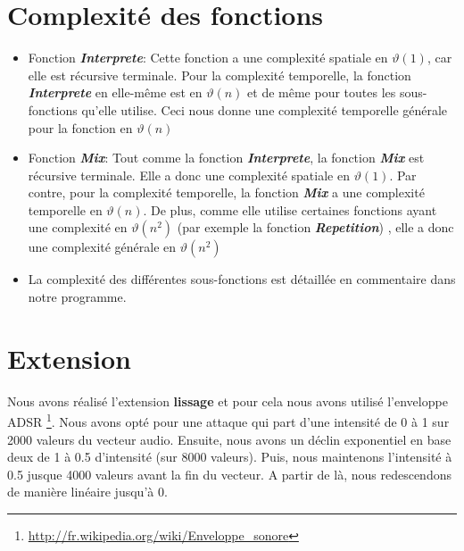 \documentclass[a4paper,12pt]{report}
\begin{document}
\section*{Complexité des fonctions}
\begin{itemize}


\item Fonction \textit{\textbf{Interprete}}: Cette fonction a une complexité spatiale en $\vartheta(1)$, car elle est récursive terminale.
Pour la complexité temporelle, la fonction \textit{\textbf {Interprete}} en elle-même est en  $\vartheta(n)$ et de même pour toutes les sous-fonctions qu'elle utilise. Ceci nous donne une complexité temporelle  générale pour la fonction en  $\vartheta(n)$
\item Fonction \textit{\textbf{Mix}}: Tout comme la fonction \textit{\textbf{Interprete}}, la fonction \textit{\textbf{Mix}} est récursive terminale. Elle a donc une complexité spatiale en  $\vartheta(1)$. Par contre, pour la complexité temporelle, la fonction \textit{\textbf{Mix}} a une complexité temporelle en  $\vartheta(n)$. De plus, comme elle utilise certaines fonctions ayant une complexité en  $\vartheta(n^2)$ (par exemple la fonction \textit{\textbf{Repetition}}) , elle a donc une complexité générale en  $\vartheta(n^2)$
\item La complexité des différentes sous-fonctions est détaillée en commentaire dans notre programme. 

\end{itemize} 


\section*{Extension}
Nous avons réalisé l'extension {\large \textbf{lissage}} et pour cela nous avons utilisé l'enveloppe ADSR \footnote{\url{http://fr.wikipedia.org/wiki/Enveloppe_sonore}}. Nous avons opté pour une attaque qui part d'une intensité de 0 à 1 sur 2000 valeurs du vecteur audio. Ensuite, nous avons un déclin exponentiel en base deux de 1 à 0.5 d'intensité (sur 8000 valeurs). Puis, nous maintenons l'intensité à 0.5 jusque 4000 valeurs avant la fin du vecteur. A partir de là, nous redescendons de manière linéaire jusqu'à 0.
\end{document}
